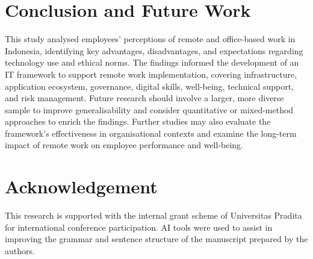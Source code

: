 \documentclass[a4paper, conference]{IEEEtran}
\begin{document}
\section{Conclusion and Future Work}

This study analysed employees' perceptions of remote and office-based work in Indonesia, identifying key advantages, disadvantages, and expectations regarding technology use and ethical norms. The findings informed the development of an IT framework to support remote work implementation, covering infrastructure, application ecosystem, governance, digital skills, well-being, technical support, and risk management. Future research should involve a larger, more diverse sample to improve generalisability and consider quantitative or mixed-method approaches to enrich the findings. Further studies may also evaluate the framework's effectiveness in organisational contexts and examine the long-term impact of remote work on employee performance and well-being.

\section*{Acknowledgement}

This research is supported with the internal grant scheme of Universitas Pradita for international conference participation. AI tools were used to assist in improving the grammar and sentence structure of the manuscript prepared by the authors.



\end{document}
